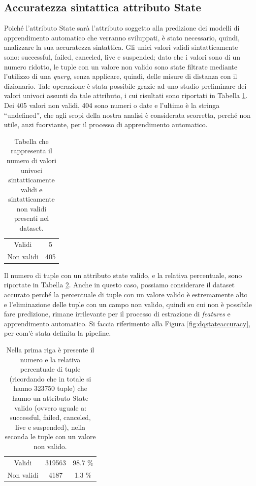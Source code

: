 \subsection{Accuratezza sintattica attributo State}
Poiché l'attributo State sarà l'attributo soggetto alla predizione dei modelli di apprendimento automatico che verranno sviluppati, è stato necessario, quindi, analizzare la sua accuratezza sintattica.
Gli unici valori validi sintatticamente sono: successful, failed, canceled, live e suspended; dato che i valori sono di un numero ridotto, le tuple con un valore non valido sono state filtrate mediante l'utilizzo di una \textit{query}, senza applicare, quindi, delle misure di distanza con il dizionario. 
Tale operazione è stata possibile grazie ad uno studio preliminare dei valori univoci assunti da tale attributo, i cui risultati sono riportati in Tabella \ref{tab:unique_state}.
Dei 405 valori non validi, 404 sono numeri o date e l'ultimo è la stringa “undefined”, che agli scopi della nostra analisi è considerata scorretta, perché non utile, anzi fuorviante, per il processo di apprendimento automatico. 
\begin{table}
	\caption{Tabella che rappresenta il numero di valori univoci sintatticamente validi e sintatticamente non validi presenti nel dataset.}
	
	\label{tab:unique_state}
	
	\centering
	\begin{tabular}{c|c}
		Validi & 5\\ 
		Non validi & 405 \\
	\end{tabular}
\end{table} 
Il numero di tuple con un attributo state valido, e la relativa percentuale, sono riportate in Tabella \ref{tab:acc_state}.
Anche in questo caso, possiamo considerare il dataset accurato perché la percentuale di tuple con un valore valido è estremamente alto e l'eliminazione delle tuple con un campo non valido, quindi su cui non è possibile fare predizione, rimane irrilevante per il processo di estrazione di \textit{features} e apprendimento automatico.
Si faccia riferimento alla Figura \ref{fig:dqstateaccuracy}, per com'è stata definita la pipeline.
\begin{table}
	\caption{Nella prima riga è presente il numero e la relativa percentuale di tuple (ricordando che in totale si hanno 323750 tuple) che hanno un attributo State valido (ovvero uguale a: successful, failed, canceled, live e suspended), nella seconda le tuple con un valore non valido.}
	
	\label{tab:acc_state}
	
	\centering
	\begin{tabular}{c|cc}
		Validi & 319563 & 98.7 \% \\ 
		Non validi & 4187 & 1.3 \% \\
	\end{tabular}
\end{table} 

